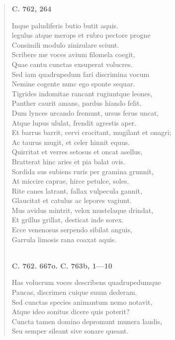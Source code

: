 \documentclass[11pt, a4paper]{report}
\begin{document}
\begin{verse}
    \begin{center} \textbf{C. 762, 264} \end{center} \marginpar{[249]} Inque paludiferis butio butit aquis. \\ legulus atque merops et rubro pectore progne \\ Consimili modulo zinizulare sciunt. \\ Scribere me voces avium filomela coegit, \\ Quae cantu cunctas exsuperat volucres. \\ Sed iam quadrupedum fari discrimina vocum \\ Nemine cogente nunc ego sponte sequar. \\ Tigrides indomitae rancant rugiuntque leones, \\ Panther caurit amans, pardus hiando felit. \\ Dum lynces urcando fremunt, ursus ferus uncat, \\ Atque lupus ululat, frendit agrestis aper. \\ Et barrus barrit, cervi crocitant, mugilant et onagri; \\ Ac taurus mugit, et celer hinnit equus. \\ Quirritat et verres setosus et oncat asellus, \\ Bratterat hinc aries et pia balat ovis. \\ Sordida sus subiens ruris per gramina grunnit, \\ At miccire caprae, hirce petulce, soles. \\ Rite canes latrant, fallax vulpecula gannit, \\ Glaucitat et catulus ac lepores vagiunt. \\ Mus avidus mintrit, velox mustelaque drindat, \\ Et grillus grillat, desticat inde sorex. \\ Ecce venenosus serpendo sibilat anguis, \\ Garrula limosis rana coaxat aquis. \\ 
        ﻿\pagebreak 
    \begin{center} \textbf{C. 762. 667o. C. 763b, 1—10} \end{center} \marginpar{[250]} Has volucrum voces describens quadrupedumque \\ Paucas, discrimen cuique suum dederam. \\ Sed cunctas species animantum nemo notavit, \\ Atque ideo sonitus dicere quis poterit? \\ Cuncta tamen domino depromunt munera laudis, \\ Seu semper sileant sive sonare queant. \\ 
      \end{verse}
  
\end{document}

